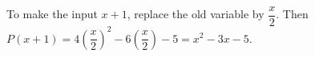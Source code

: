To make the input $ x+1 $, replace the old variable by $\dfrac{x}{2}$. Then $ P(x+1)=4(\dfrac{x}{2})^2-6(\dfrac{x}{2})-5=\boxed{x^2-3x-5}$.
